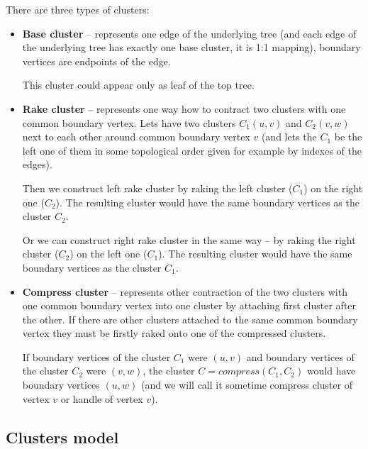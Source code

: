 There are three types of clusters:

\begin{itemize}

\item {\bf Base cluster} -- represents one edge of the underlying tree (and each
edge of the underlying tree has exactly one base cluster, it is 1:1 mapping),
boundary vertices are endpoints of the edge.

This cluster could appear only as leaf of the top tree.

\item {\bf Rake cluster} -- represents one way how to contract two clusters
with one common boundary vertex. Lets have two clusters $C_1(u,v)$ and
$C_2(v,w)$ next to each other around common boundary vertex $v$ (and lets the
$C_1$ be the left one of them in some topological order given for example by
indexes of the edges).

Then we construct {\I left rake cluster} by {\I raking} the left cluster ($C_1$)
on the right one ($C_2$). The resulting cluster would have the same boundary
vertices as the cluster $C_2$.

Or we can construct {\I right rake cluster} in the same way -- by {\I raking}
the right cluster ($C_2$) on the left one ($C_1$). The resulting cluster would
have the same boundary vertices as the cluster $C_1$.


\item{\bf Compress cluster} -- represents other contraction of the two clusters
with one common boundary vertex into one cluster by attaching first cluster
after the other. If there are other clusters attached to the same common
boundary vertex they must be firstly {\I raked} onto one of the compressed
clusters.

If boundary vertices of the cluster $C_1$ were $(u,v)$ and boundary vertices
of the cluster $C_2$ were $(v,w)$, the cluster $C=compress(C_1,C_2)$ would have
boundary vertices $(u,w)$ (and we will call it sometime {\I compress cluster
of vertex $v$} or {\I handle of vertex $v$}).


\end{itemize}

\subsection{Clusters model}

